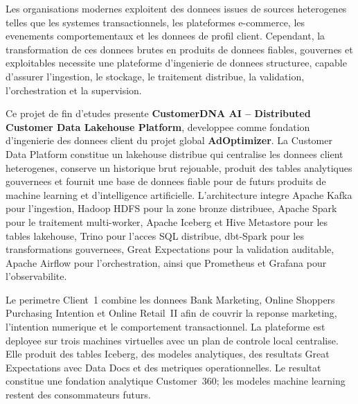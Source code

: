 \begingroup
{}
Les organisations modernes exploitent des donnees issues de sources heterogenes telles que les systemes transactionnels, les plateformes e-commerce, les evenements comportementaux et les donnees de profil client. Cependant, la transformation de ces donnees brutes en produits de donnees fiables, gouvernes et exploitables necessite une plateforme d'ingenierie de donnees structuree, capable d'assurer l'ingestion, le stockage, le traitement distribue, la validation, l'orchestration et la supervision.

Ce projet de fin d'etudes presente \textbf{CustomerDNA AI -- Distributed Customer Data Lakehouse Platform}, developpee comme fondation d'ingenierie des donnees client du projet global \textbf{AdOptimizer}. La Customer Data Platform constitue un lakehouse distribue qui centralise les donnees client heterogenes, conserve un historique brut rejouable, produit des tables analytiques gouvernees et fournit une base de donnees fiable pour de futurs produits de machine learning et d'intelligence artificielle. L'architecture integre Apache Kafka pour l'ingestion, Hadoop HDFS pour la zone bronze distribuee, Apache Spark pour le traitement multi-worker, Apache Iceberg et Hive Metastore pour les tables lakehouse, Trino pour l'acces SQL distribue, dbt-Spark pour les transformations gouvernees, Great Expectations pour la validation auditable, Apache Airflow pour l'orchestration, ainsi que Prometheus et Grafana pour l'observabilite.

Le perimetre Client~1 combine les donnees Bank Marketing, Online Shoppers Purchasing Intention et Online Retail~II afin de couvrir la reponse marketing, l'intention numerique et le comportement transactionnel. La plateforme est deployee sur trois machines virtuelles avec un plan de controle local centralise. Elle produit des tables Iceberg, des modeles analytiques, des resultats Great Expectations avec Data Docs et des metriques operationnelles. Le resultat constitue une fondation analytique Customer~360; les modeles machine learning restent des consommateurs futurs.

\endgroup
